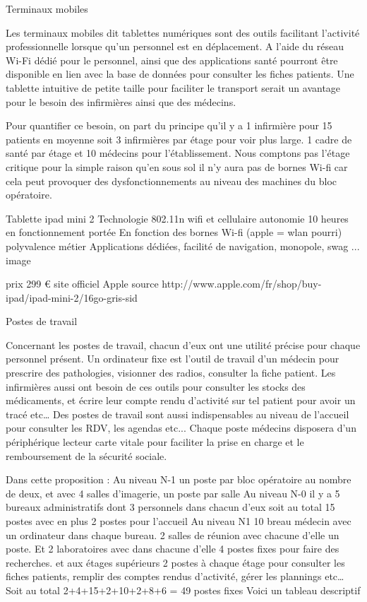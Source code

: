 Terminaux mobiles


Les terminaux mobiles dit tablettes numériques sont des outils facilitant l’activité professionnelle lorsque qu’un personnel est en déplacement. A l’aide du réseau Wi-Fi dédié pour le personnel, ainsi que des applications santé pourront être disponible en lien avec la base de données pour consulter les fiches patients.
Une tablette intuitive de petite taille pour faciliter le transport serait un avantage pour le besoin des infirmières ainsi que des médecins.


Pour quantifier ce besoin, on part du principe qu’il y a 1 infirmière pour 15 patients en moyenne soit 3 infirmières par étage pour voir plus large. 1 cadre de santé par étage et 10 médecins pour l’établissement. Nous comptons pas l’étage critique pour la simple raison qu’en sous sol il n’y aura pas de bornes Wi-fi car cela peut provoquer des dysfonctionnements au niveau des machines du bloc opératoire.






Tablette ipad mini 2
    Technologie
    802.11n wifi et cellulaire
    autonomie
    10 heures en fonctionnement
    portée
    En fonction des bornes Wi-fi (apple = wlan pourri)
    polyvalence métier
    Applications dédiées, facilité de navigation, monopole, swag ...
    image


    prix
    299 € site officiel Apple
    source
    http://www.apple.com/fr/shop/buy-ipad/ipad-mini-2/16go-gris-sid%


Postes de travail


Concernant les postes de travail, chacun d’eux ont une utilité précise pour chaque personnel présent.
Un ordinateur fixe est l’outil de travail d’un médecin pour prescrire des pathologies, visionner des radios, consulter la fiche patient. Les infirmières aussi ont besoin de ces outils pour consulter les stocks des médicaments, et écrire leur compte rendu d’activité sur tel patient pour avoir un tracé etc…
Des postes de travail sont aussi indispensables au niveau de l’accueil pour consulter les RDV, les agendas etc...
Chaque poste médecins disposera d’un périphérique lecteur carte vitale pour faciliter la prise en charge et le remboursement de la sécurité sociale.


Dans cette proposition :
Au niveau N-1 un poste par bloc opératoire au nombre de deux, et avec 4 salles d’imagerie, un poste par salle
Au niveau N-0 il y a 5 bureaux administratifs dont 3 personnels dans chacun d’eux soit au total 15 postes avec en plus 2 postes pour l’accueil
Au niveau N1 10 breau médecin avec un ordinateur dans chaque bureau. 2 salles de réunion avec chacune d’elle un poste. Et 2 laboratoires avec dans chacune d’elle 4 postes fixes pour faire des recherches.
et aux étages supérieurs 2 postes à chaque étage pour consulter les fiches patients, remplir des comptes rendus d’activité, gérer les plannings etc…
Soit au total 2+4+15+2+10+2+8+6 = 49 postes fixes
Voici un tableau descriptif




